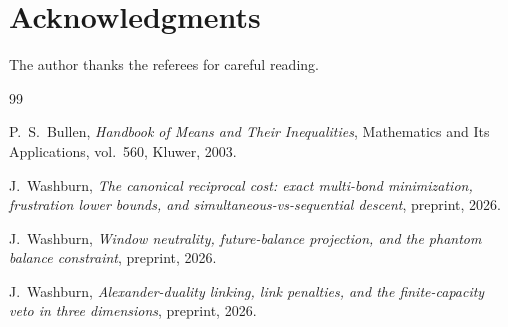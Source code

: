 \documentclass[11pt]{amsart}
\theoremstyle{definition}
\theoremstyle{remark}
\begin{document}
\section*{Acknowledgments}
The author thanks the referees for careful reading.

\begin{thebibliography}{99}

P.~S.~Bullen,
\emph{Handbook of Means and Their Inequalities},
Mathematics and Its Applications, vol.~560, Kluwer, 2003.

J.~Washburn,
\emph{The canonical reciprocal cost: exact multi-bond minimization,
frustration lower bounds, and simultaneous-vs-sequential descent},
preprint, 2026.

J.~Washburn,
\emph{Window neutrality, future-balance projection, and the phantom
balance constraint},
preprint, 2026.

J.~Washburn,
\emph{Alexander-duality linking, link penalties, and the finite-capacity
veto in three dimensions},
preprint, 2026.

\end{thebibliography}
\end{document}
